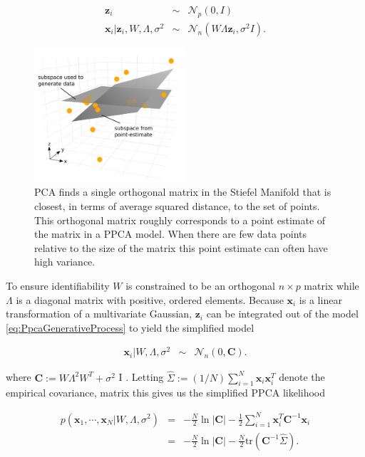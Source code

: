 \documentclass[ba]{imsart}
\newcommand{\mb}[1]{\mathbf{#1}}
\numberwithin{equation}{section}
\theoremstyle{plain}
\begin{document}
\begin{eqnarray}
\label{eq:PpcaGenerativeProcess}
\mb{z}_i &\sim& \mathcal{N}_p(0, I) \nonumber\\
\mb{x}_i | \mb{z}_i, W, \Lambda, \sigma^2 &\sim& \mathcal{N}_n(W \Lambda \mb{z}_i, \sigma^2 I).
\end{eqnarray}

\begin{figure}[h]
\centering
\vspace{.1in}
\includegraphics[width=0.5\textwidth]{figures/uncertainty_atz.pdf}
\vspace{.05in}
\caption{PCA finds a single orthogonal matrix in the Stiefel Manifold that is closest, in terms of average squared distance, to the set of points. This orthogonal matrix roughly corresponds to a point estimate of the matrix in a PPCA model. When there are few data points relative to the size of the matrix this point estimate can often have high variance.}
\label{fig:MleSubspaceEstimate}
\end{figure}

\noindent To ensure identifiability $W$ is constrained to be an orthogonal $n \times p$ matrix while $\Lambda$ is a diagonal matrix with positive, ordered elements. Because $\mb{x}_i$ is a linear transformation of a multivariate Gaussian, $\mb{z}_i$ can be integrated out of the model \ref{eq:PpcaGenerativeProcess} to yield the simplified model

\begin{eqnarray}
\label{eq:PpcaSimplifiedModel}
\mb{x}_i | W, \Lambda, \sigma^2 &\sim& \mathcal{N}_n(0, \textbf{C}).
\end{eqnarray}

\noindent where $\textbf{C} := W \Lambda^2 W^T + \sigma^2$ I \citep{murphy2012machine}. Letting $\hat{\Sigma} := (1/N) \sum_{i=1}^N \mb{x}_i \mb{x}_i^T$ denote the empirical covariance, matrix this gives us the simplified PPCA likelihood

\begin{eqnarray}
p(\mb{x}_1, \cdots, \mb{x}_N | W, \Lambda, \sigma^2) &=& -\frac{N}{2} \ln |\textbf{C}| - \frac{1}{2} \sum_{i=1}^N \mb{x}_i^T \textbf{C}^{-1} \mb{x}_i\\
&=& -\frac{N}{2} \ln |\textbf{C}| - \frac{N}{2} \mathrm{tr} (\textbf{C}^{-1} \hat{\Sigma}).
\label{eq:ppca_likelihood}
\end{eqnarray}
\end{document}
